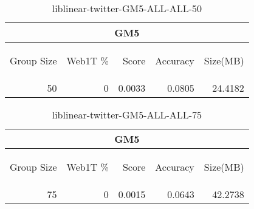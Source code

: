 \begin{center}
\begin{table}[htbp]
\begin{tabular}{ | r | r | r | r | r |}
\hline
\multicolumn{5}{|c|}{GM5}\\
\hline
\begin{sideways}Group Size\end{sideways} & \begin{sideways}Web1T \%\end{sideways} & \begin{sideways}Score\end{sideways} & \begin{sideways}Accuracy\end{sideways} & \begin{sideways}Size(MB)\end{sideways}\\
\hline
\multirow{0}{*}{50}
 & 0 & 0.0033 & 0.0805 & 24.4182\\ \cline{2-5}
\hline
\end{tabular}
\caption{liblinear-twitter-GM5-ALL-ALL-50}
\label{table:liblinear-twitter-GM5-ALL-ALL-50}
\end{table}
\end{center}

\begin{center}
\begin{table}[htbp]
\begin{tabular}{ | r | r | r | r | r |}
\hline
\multicolumn{5}{|c|}{GM5}\\
\hline
\begin{sideways}Group Size\end{sideways} & \begin{sideways}Web1T \%\end{sideways} & \begin{sideways}Score\end{sideways} & \begin{sideways}Accuracy\end{sideways} & \begin{sideways}Size(MB)\end{sideways}\\
\hline
\multirow{0}{*}{75}
 & 0 & 0.0015 & 0.0643 & 42.2738\\ \cline{2-5}
\hline
\end{tabular}
\caption{liblinear-twitter-GM5-ALL-ALL-75}
\label{table:liblinear-twitter-GM5-ALL-ALL-75}
\end{table}
\end{center}

